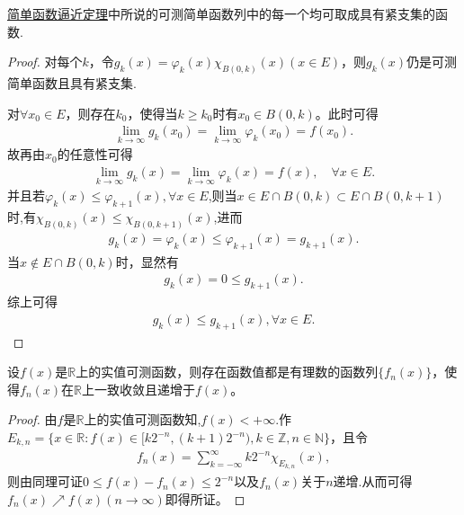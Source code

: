 \documentclass[../../main.tex]{subfiles}%
\begin{document}
\begin{corollary}\label{corollary:简单函数逼近定理的加强形式}
\hyperref[theorem:简单函数逼近定理]{简单函数逼近定理}中所说的可测简单函数列中的每一个均可取成具有紧支集的函数.
\end{corollary}
\begin{proof}

对每个$k$，令$g_k(x) = \varphi_k(x)\chi_{B(0,k)}(x) (x \in E)$，则$g_k(x)$仍是可测简单函数且具有紧支集.

对$\forall x_0 \in E$，则存在$k_0$，使得当$k \geqslant k_0$时有$x_0 \in B(0,k)$。此时可得
\begin{align*}
\lim_{k \to \infty} g_k(x_0) = \lim_{k \to \infty} \varphi_k(x_0) = f(x_0).
\end{align*}
故再由$x_0$的任意性可得
\begin{align*}
\lim_{k \to \infty} g_k(x) = \lim_{k \to \infty} \varphi_k(x) = f(x),\quad \forall x\in E.
\end{align*} 
并且若$\varphi_k(x)\leqslant \varphi_{k+1}(x),\forall x\in E$,则当$x\in E\cap B(0,k) \subset E\cap B(0,k + 1)$时,有$\chi _{B\left( 0,k \right)}\left( x \right) \leqslant \chi _{B\left( 0,k+1 \right)}\left( x \right)$,进而
\begin{align*}
g_k(x) = \varphi_k(x) \leqslant \varphi_{k + 1}(x) = g_{k + 1}(x).
\end{align*}
当$x\notin E\cap B(0,k)$时，显然有
\begin{align*}
g_k(x) = 0 \leqslant g_{k + 1}(x).
\end{align*}
综上可得
\begin{align*}
g_k(x) \leqslant g_{k + 1}(x), \forall x\in E.
\end{align*} 

\end{proof}

\begin{theorem}
设$f(x)$是$\mathbb{R}$上的实值可测函数，则存在函数值都是有理数的函数列$\{f_n(x)\}$，使得$f_n(x)$在$\mathbb{R}$上一致收敛且递增于$f(x)$。
\end{theorem}
\begin{proof}

由$f$是$\mathbb{R}$上的实值可测函数知,$f(x)<+\infty$.作$E_{k,n} = \{x \in \mathbb{R}: f(x) \in [k2^{-n}, (k + 1)2^{-n}), k \in \mathbb{Z}, n \in \mathbb{N}\}$，且令
\begin{align*}
f_n(x) = \sum_{k = -\infty}^{\infty} k2^{-n} \chi_{E_{k,n}}(x),
\end{align*}
则由同理可证$0 \leqslant f(x) - f_n(x) \leqslant 2^{-n}$以及$f_n(x)$关于$n$递增.从而可得$f_n(x) \nearrow f(x) (n \to \infty)$即得所证。 

\end{proof}
\end{document}

